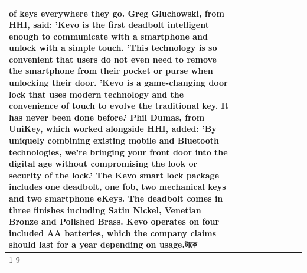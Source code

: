 \begin{table}[H]
\begin{tabular}{lllrlllll}
of keys everywhere they go. Greg Gluchowski, from HHI, said: 'Kevo is the first deadbolt intelligent enough to communicate with a smartphone and unlock with a simple touch. 'This technology is so convenient that users do not even need to remove the smartphone from their pocket or purse when unlocking their door. 'Kevo is a game-changing door lock that uses modern technology and the convenience of touch to evolve the traditional key. It has never been done before.' Phil Dumas, from UniKey, which worked alongside HHI, added: 'By uniquely combining existing mobile and Bluetooth technologies, we’re bringing your front door into the digital age without compromising the look or security of the lock.' The Kevo smart lock package includes one deadbolt, one fob, two mechanical keys and two smartphone eKeys. The deadbolt comes in three finishes including Satin Nickel, Venetian Bronze and Polished Brass. Kevo operates on four included AA batteries, which the company claims should last for a year depending on usage.টাকে \\
\cline{1-9}

\end{tabular}
\end{table}
